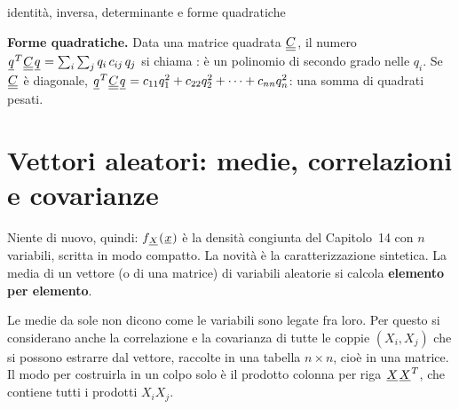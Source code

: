 \begin{richiamo}{identità, inversa, determinante e forme quadratiche}
\begin{center}
\end{center}
\textbf{Forme quadratiche.} Data una matrice quadrata ${\mkern1mu\underline{\underline{C}}\mkern1mu}$, il numero
${\mkern1mu\underline{q}\mkern1mu}^T {\mkern1mu\underline{\underline{C}}\mkern1mu} {\mkern1mu\underline{q}\mkern1mu} = \sum_i \sum_j q_i\, c_{ij}\, q_j$ si chiama : è un polinomio di
secondo grado nelle $q_i$. Se ${\mkern1mu\underline{\underline{C}}\mkern1mu}$ è diagonale, ${\mkern1mu\underline{q}\mkern1mu}^T {\mkern1mu\underline{\underline{C}}\mkern1mu} {\mkern1mu\underline{q}\mkern1mu} = c_{11} q_1^2 + c_{22} q_2^2 + \cdots
+ c_{nn} q_n^2$: una somma di quadrati pesati.
\end{richiamo}

\section{Vettori aleatori: medie, correlazioni e covarianze}


Niente di nuovo, quindi: $f_{{\mkern1mu\underline{X}\mkern1mu}}({\mkern1mu\underline{x}\mkern1mu})$ è la densità congiunta del Capitolo~14 con $n$ variabili, scritta in
modo compatto. La novità è la caratterizzazione sintetica. La media di un vettore (o di una matrice) di variabili
aleatorie si calcola \textbf{elemento per elemento}.


Le medie da sole non dicono come le variabili sono legate fra loro. Per questo si considerano anche la correlazione e
la covarianza di tutte le coppie $(X_i, X_j)$ che si possono estrarre dal vettore, raccolte in una tabella $n \times n$,
cioè in una matrice. Il modo per costruirla in un colpo solo è il prodotto colonna per riga ${\mkern1mu\underline{X}\mkern1mu}{\mkern1mu\underline{X}\mkern1mu}^T$, che
contiene tutti i prodotti $X_i X_j$.

